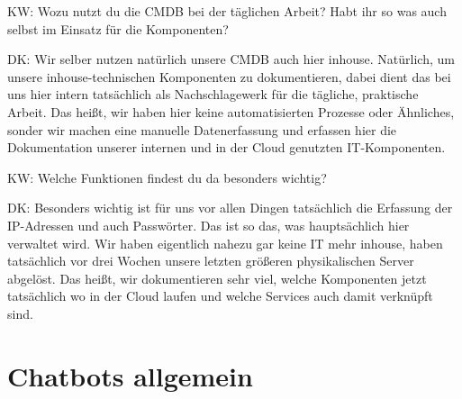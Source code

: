 \begin{list}{X:}{\setlength{\labelsep}{5mm}}
\item[KW:] Wozu nutzt du die CMDB bei der täglichen Arbeit? Habt ihr so was auch selbst im Einsatz für die Komponenten?
\item[DK:] Wir selber nutzen natürlich unsere CMDB auch hier inhouse. Natürlich, um unsere inhouse-technischen Komponenten zu dokumentieren, dabei dient das bei uns hier intern tatsächlich als Nachschlagewerk für die tägliche, praktische Arbeit. Das heißt, wir haben hier keine automatisierten Prozesse oder Ähnliches, sonder wir machen eine manuelle Datenerfassung und erfassen hier die Dokumentation unserer internen und in der Cloud genutzten IT-Komponenten.
\item[KW:] Welche Funktionen findest du da besonders wichtig?
\item[DK:] Besonders wichtig ist für uns vor allen Dingen tatsächlich die Erfassung der IP-Adressen und auch Passwörter. Das ist so das, was hauptsächlich hier verwaltet wird. Wir haben eigentlich nahezu gar keine IT mehr inhouse, haben tatsächlich vor drei Wochen unsere letzten größeren physikalischen Server abgelöst. Das heißt, wir dokumentieren sehr viel, welche Komponenten jetzt tatsächlich wo in der Cloud laufen und welche Services auch damit verknüpft sind.
\end{list}

\section*{Chatbots allgemein}

